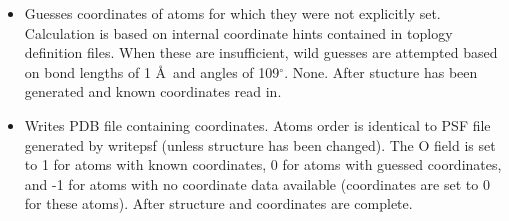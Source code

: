 \begin{itemize}
\item {}
{Guesses coordinates of atoms for which they were not explicitly set.
Calculation is based on internal coordinate hints contained in toplogy
definition files.  When these are insufficient, wild guesses are attempted
based on bond lengths of 1 \AA\ and angles of 109$^\circ$.}
{None.}
{After stucture has been generated and known coordinates read in.}

\item {}
{Writes PDB file containing coordinates.  Atoms order is identical to
PSF file generated by writepsf (unless structure has been changed).
The O field is set to 1 for atoms with known coordinates, 0 for atoms
with guessed coordinates, and -1 for atoms with no coordinate data
available (coordinates are set to 0 for these atoms).}
{}
{After structure and coordinates are complete.}

\end{itemize}
